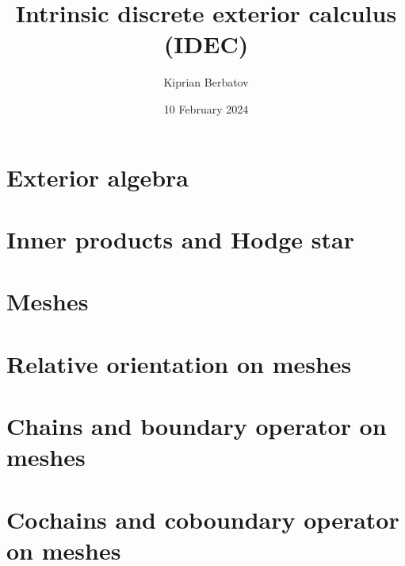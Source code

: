 \documentclass[fleqn]{article}
\title{Intrinsic discrete exterior calculus (IDEC)}
\author{Kiprian Berbatov}
\date{10 February 2024}
\theoremstyle{definition}
\begin{document}
\maketitle

\tableofcontents

\section{Exterior algebra}
\label{section:exterior_algebra}


\section{Inner products and Hodge star}
\label{section:inner_products_and_hodge_star}


\section{Meshes}
\label{section:meshes}


\section{Relative orientation on meshes}
\label{section:relative_orientation_on_meshes}





\section{Chains and boundary operator on meshes}
\label{section:chains_and_boundary_operator_on_meshes}








\section{Cochains and coboundary operator on meshes}
\label{section:cochains_and_coboundary_operator_on_meshes}




\end{document}

